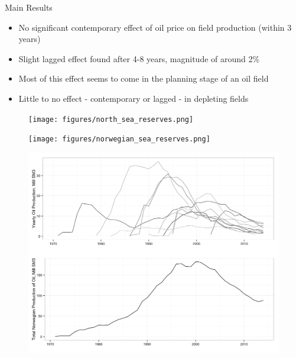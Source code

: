 \documentclass{beamer}
\begin{document}
\begin{frame}[plain]
	Main Results
	\begin{itemize}
		\item No significant contemporary effect of oil price on field production (within 3 years)
		\item Slight lagged effect found after 4-8 years, magnitude of around 2\%
		\item Most of this effect seems to come in the planning stage of an oil field
		\item Little to no effect - contemporary or lagged - in depleting fields
	\end{itemize}
\end{frame}

\begin{frame}[plain]
	\begin{figure}
	\texttt{[image: figures/north\_sea\_reserves.png]}	
	\label{north_sea_reserves}
	\end{figure}
\end{frame}

\begin{frame}[plain]
	\begin{figure}
	\texttt{[image: figures/norwegian\_sea\_reserves.png]}
	
	\label{norwegian_sea_reserves}
	\end{figure}
\end{frame}

\begin{frame}[plain]

\begin{figure}
	\includegraphics[width=.8\textwidth]{figures/oil_decline.png}
	
	\label{oil_decline}
\end{figure}

\end{frame}
\end{document}
